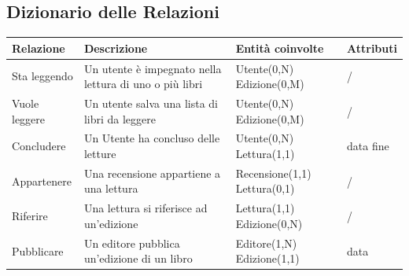 \documentclass{article}
\begin{document}
\subsection{Dizionario delle Relazioni}
\begin{center}
	\renewcommand{\arraystretch}{1.5} %
	\begin{longtable}{|p{2cm}|p{4cm}|p{3cm}|p{2	cm}|}
		\hline
		\textbf{Relazione}                        & \textbf{Descrizione}                                   & \textbf{Entità coinvolte} & \textbf{Attributi} \\
		\hline
		\endfirsthead


		Sta leggendo                              & Un utente è impegnato nella lettura di uno o più libri &
		Utente(0,N) \vphantom{2}Edizione(0,M)     & /                                                                                                       \\
		\hline

		Vuole leggere                             & Un utente salva una lista di libri da leggere          &
		Utente(0,N) \vphantom{2}Edizione(0,M)     & /                                                                                                       \\
		\hline

		Concludere                                & Un Utente ha concluso delle letture                    &
		Utente(0,N) \vphantom{2}Lettura(1,1)      & data fine                                                                                               \\
		\hline

		Appartenere                               & Una recensione appartiene a una lettura                &
		Recensione(1,1) \vphantom{2}Lettura(0,1)  & /                                                                                                       \\
		\hline

		Riferire                                  & Una lettura si riferisce ad un'edizione                &
		Lettura(1,1) \vphantom{2}Edizione(0,N)    & /                                                                                                       \\
		\hline

		Pubblicare                                & Un editore pubblica un'edizione di un libro            &
		Editore(1,N) \vphantom{2}Edizione(1,1)    & data                                                                                                    \\
		\hline


\end{longtable}
\end{center}
\end{document}
